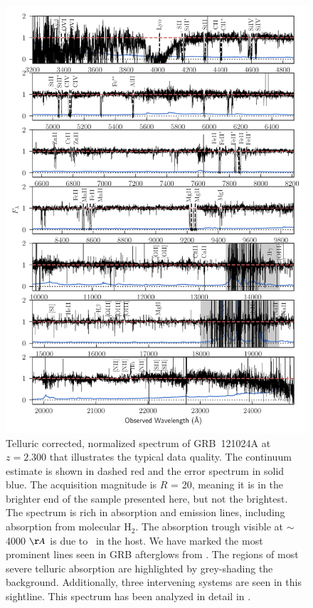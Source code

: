 \documentclass[longauth]{aa}    %
\begin{document}
\begin{figure}
	\centerline{\includegraphics[width=0.85\linewidth]{figures/GRB121024A.pdf}}
	\caption{Telluric corrected, normalized spectrum of GRB~121024A at $z = 2.300$
		that illustrates the typical data quality. The continuum estimate is shown in
		dashed red and the error spectrum in solid blue. The acquisition magnitude is
		$R$ = 20, meaning it is in the brighter end of the sample presented here, but
		not the brightest. The spectrum is rich in absorption and emission lines, including
		absorption from molecular $\mathrm{H_2}$. The absorption trough visible at
		$\sim$ 4000 $\AA$ is due to \lya~in the host. We have marked the most prominent
		lines seen in GRB afterglows from \citet{Christensen2011a}. The regions of most
		severe telluric absorption are highlighted by grey-shading the background.
		Additionally, three intervening systems are seen in this sightline. This
		spectrum has been analyzed in detail in \citet{Friis2015}.}
	\label{fig:spectrum}
\end{figure}


\end{document}
